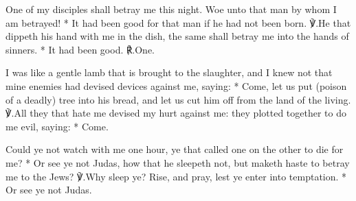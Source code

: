 \documentclass[12pt]{book}
\begin{document}

\begin{enpars}
 One of my disciples shall betray me this night. Woe unto that man by whom I am betrayed!
* It had been good for that man if he had not been born.
℣.\@ He that dippeth his hand with me in the dish, the same shall betray me into the hands of sinners.
*  It had been good. ℟.\@  One.
\end{enpars}






\silently


\begin{enpars}
I was like a gentle lamb that is brought to the slaughter, and I knew not that mine enemies had devised devices against me, saying:
* Come, let us put (poison of a deadly) tree into his bread, and let us cut him off from the land of the living.
℣.\@ All they that hate me devised my hurt against me: they plotted together to do me evil, saying: * Come.
\end{enpars}


\begin{enpars}
 Could ye not watch with me one hour, ye that called one on the other to die for me?
* Or see ye not Judas, how that he sleepeth not, but maketh haste to betray me to the Jews?
℣.\@ Why sleep ye? Rise, and pray, lest ye enter into temptation.
* Or see ye not Judas.\end{enpars}
\end{document}
